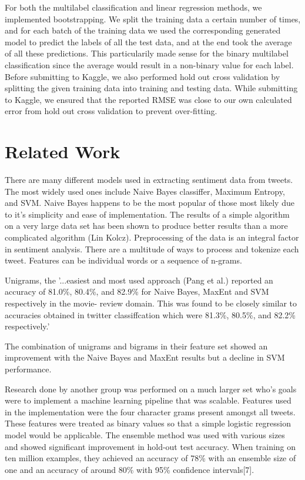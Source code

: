 \documentclass{article}
\begin{document}
For both the multilabel classification and linear regression methods, we implemented bootstrapping. We split the training data a certain number of times, and for each batch of the training data we used the corresponding generated model to predict the labels of all the test data, and at the end took the average of all these predictions. This particularily made sense for the binary multilabel classification since the average would result in a non-binary value for each label. Before submitting to Kaggle, we also performed hold out cross validation by splitting the given training data into training and testing data. While submitting to Kaggle, we ensured that the reported RMSE was close to our own calculated error from hold out cross validation to prevent over-fitting.


\section{Related Work}
There are many different models used in extracting sentiment data from tweets. The most widely used ones include Naive Bayes classiffer, Maximum Entropy, and SVM. Naive Bayes happens to be the most popular of those most likely due to it's simplicity and ease of implementation. The results of a simple algorithm on a very large data set has been shown to produce better results than a more complicated algorithm (Lin Kolcz). Preprocessing of the data is an integral factor in sentiment analysis. There are a multitude of ways to process and tokenize each tweet. Features can be individual words or a sequence of n-grams. 

Unigrams, the '...easiest and most used approach (Pang et al.) reported an accuracy of 81.0\%, 80.4\%, and 82.9\% for Naive Bayes, MaxEnt and SVM respectively in the movie- review domain. This was found to be closely similar to accuracies obtained in twitter classiffcation which were 81.3\%, 80.5\%, and 82.2\% respectively.'

The combination of unigrams and bigrams in their feature set showed an improvement with the Naive Bayes and MaxEnt results but a decline in SVM performance. 

Research done by another group was performed on a much larger set who's goals were to implement a machine learning pipeline that was scalable. Features used in the implementation were the four character grams present amongst all tweets. These features were treated as binary values so that a simple logistic regression model would be applicable. The ensemble method was used with various sizes and showed significant improvement in hold-out test accuracy. When training on ten million examples, they achieved an accuracy of 78\% with an ensemble size of one and an accuracy of around 80\% with 95\% confidence intervals[7].
\end{document}
